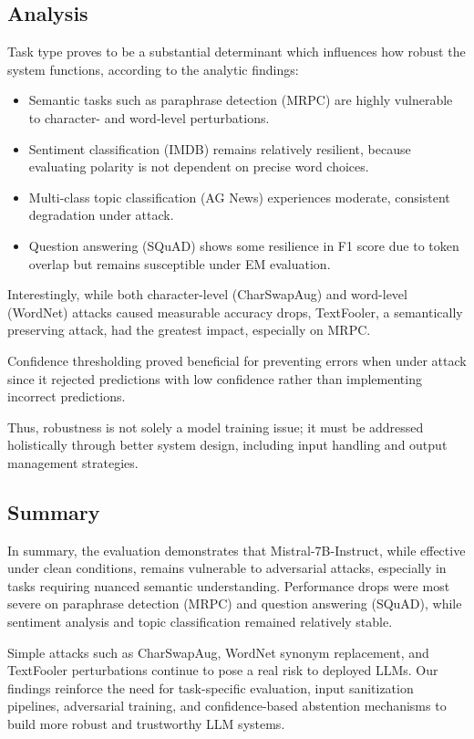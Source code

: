 \documentclass[conference]{IEEEtran}
\begin{document}
\subsection{Analysis}

Task type proves to be a substantial determinant which influences how robust the system functions, according to the analytic findings:
\begin{itemize}
    \item Semantic tasks such as paraphrase detection (MRPC) are highly vulnerable to character- and word-level perturbations.
    \item Sentiment classification (IMDB) remains relatively resilient, because evaluating polarity is not dependent on precise word choices.
    \item Multi-class topic classification (AG News) experiences moderate, consistent degradation under attack.
    \item Question answering (SQuAD) shows some resilience in F1 score due to token overlap but remains susceptible under EM evaluation.
\end{itemize}

Interestingly, while both character-level (CharSwapAug) and word-level (WordNet) attacks caused measurable accuracy drops, TextFooler, a semantically preserving attack, had the greatest impact, especially on MRPC.

Confidence thresholding proved beneficial for preventing errors when under attack since it rejected predictions with low confidence rather than implementing incorrect predictions.

Thus, robustness is not solely a model training issue; it must be addressed holistically through better system design, including input handling and output management strategies.


\subsection{Summary}


In summary, the evaluation demonstrates that Mistral-7B-Instruct, while effective under clean conditions, remains vulnerable to adversarial attacks, especially in tasks requiring nuanced semantic understanding.  
Performance drops were most severe on paraphrase detection (MRPC) and question answering (SQuAD), while sentiment analysis and topic classification remained relatively stable.

Simple attacks such as CharSwapAug, WordNet synonym replacement, and TextFooler perturbations continue to pose a real risk to deployed LLMs.  
Our findings reinforce the need for task-specific evaluation, input sanitization pipelines, adversarial training, and confidence-based abstention mechanisms to build more robust and trustworthy LLM systems.
\end{document}
